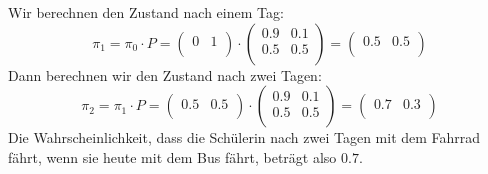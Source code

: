\begin{myexercise}[Verkehrsmittel]
\begin{myanswer}
        Wir berechnen den Zustand nach einem Tag:
        \[
            \pi_1 = \pi_0 \cdot P =
            \begin{pmatrix}
                0 & 1 \\
            \end{pmatrix}
            \cdot
            \begin{pmatrix}
                0.9 & 0.1 \\
                0.5 & 0.5 \\
            \end{pmatrix}
            =
            \begin{pmatrix}
                0.5 & 0.5 \\
            \end{pmatrix}
        \]
        Dann berechnen wir den Zustand nach zwei Tagen:
        \[
            \pi_2 = \pi_1 \cdot P =
            \begin{pmatrix}
                0.5 & 0.5 \\
            \end{pmatrix}
            \cdot
            \begin{pmatrix}
                0.9 & 0.1 \\
                0.5 & 0.5 \\
            \end{pmatrix}
            =
            \begin{pmatrix}
                0.7 & 0.3 \\
            \end{pmatrix}
        \]
        Die Wahrscheinlichkeit, dass die Schülerin nach zwei Tagen mit dem Fahrrad fährt, wenn sie heute mit dem Bus fährt, beträgt also $0.7$.
    \end{myanswer}
\end{myexercise}

